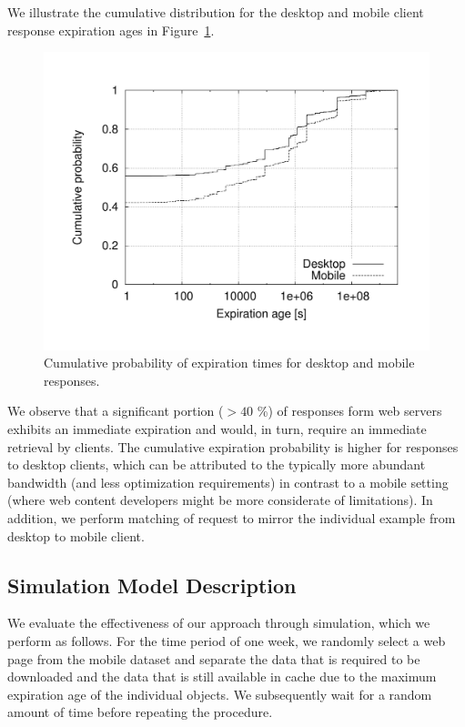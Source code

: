 \documentclass[letterpaper,journal,onecolumn,draftcls]{IEEEtran}
\begin{document}
We illustrate the cumulative distribution for the desktop and mobile client response expiration ages in Figure~\ref{fig:comp_cpd}.
\begin{figure}
	\centering
	\includegraphics[width=.5\linewidth]{comp_cpd}
	\caption{Cumulative probability of expiration times for desktop and mobile responses.}
	\label{fig:comp_cpd}
\end{figure}
We observe that a significant portion ($>40$ \%) of responses form web servers exhibits an immediate expiration and would, in turn, require an immediate retrieval by clients.
The cumulative expiration probability is higher for responses to desktop clients, which can be attributed to the typically more abundant bandwidth (and less optimization requirements) in contrast to a mobile setting (where web content developers might be more considerate of limitations).
In addition, we perform matching of request to mirror the individual example from desktop to mobile client. 


\subsection{Simulation Model Description}
We evaluate the effectiveness of our approach through simulation, which we perform as follows.
For the time period of one week, we randomly select a web page from the mobile dataset and separate the data that is required to be downloaded and the data that is still available in cache due to the maximum expiration age of the individual objects. We subsequently wait for a random amount of time before repeating the procedure.
\end{document}

